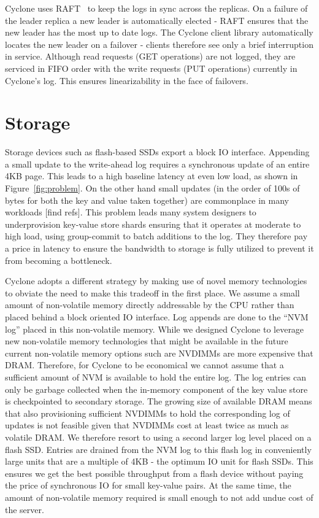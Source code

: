 \documentclass[pageno]{jpaper}
\begin{document}
Cyclone uses RAFT~\cite{raft} to keep the logs in sync across the replicas. On a
failure of the leader replica a new leader is automatically elected - RAFT
ensures that the new leader has the most up to date logs. The Cyclone client
library automatically locates the new leader on a failover - clients therefore
see only a brief interruption in service. Although read requests (GET
operations) are not logged, they are serviced in FIFO order with the write requests
(PUT operations) currently in Cyclone's log. This ensures linearizability in the
face of failovers.

\section{Storage}
\label{sec:storage}
Storage devices such as flash-based SSDs export a block IO interface. Appending
a small update to the write-ahead log requires a synchronous update of an entire
4KB page. This leads to a high baseline latency at even low load, as shown in
Figure~\ref{fig:problem}.  On the other hand small updates (in the order of 100s
of bytes for both the key and value taken together) are commonplace in many
workloads [find refs]. This problem leads many system designers to
underprovision key-value store shards ensuring that it operates at moderate to
high load, using group-commit to batch additions to the log. They therefore pay
a price in latency to ensure the bandwidth to storage is fully utilized to
prevent it from becoming a bottleneck.

Cyclone adopts a different strategy by making use of novel memory technologies
to obviate the need to make this tradeoff in the first place. We assume a small
amount of non-volatile memory directly addressable by the CPU rather than placed
behind a block oriented IO interface. Log appends are done to the ``NVM log''
placed in this non-volatile memory. While we designed Cyclone to leverage new
non-volatile memory technologies that might be available in the
future~\cite{3dxpoint} current non-volatile memory options such are NVDIMMs
are more expensive that DRAM. Therefore, for Cyclone to be economical
we cannot assume that a sufficient amount of NVM is available to hold the entire
log. The log entries can only be garbage collected when the in-memory component
of the key value store is checkpointed to secondary storage. The growing size of
available DRAM means that also provisioning sufficient NVDIMMs to hold the
corresponding log of updates is not feasible given that NVDIMMs cost at least
twice as much as volatile DRAM. We therefore resort to using a second larger log
level placed on a flash SSD. Entries are drained from the NVM log to this flash
log in conveniently large units that are a multiple of 4KB - the optimum IO unit
for flash SSDs. This ensures we get the best
possible throughput from a flash device without paying the price of synchronous
IO for small key-value pairs. At the same time, the amount of non-volatile
memory required is small enough to not add undue cost of the server.
\end{document}
